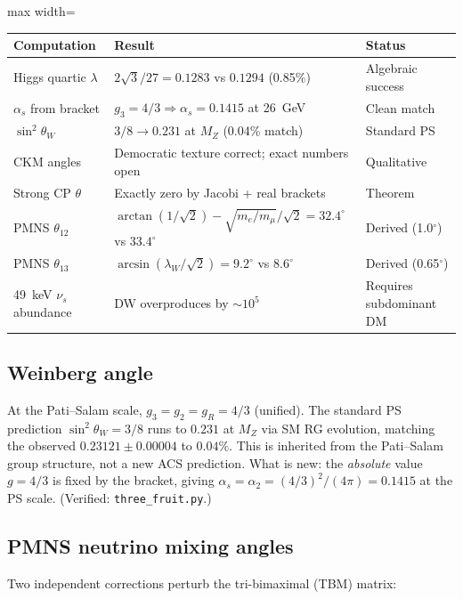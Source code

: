 \documentclass[11pt,a4paper]{article}
\theoremstyle{plain}
\theoremstyle{definition}
\theoremstyle{remark}
\begin{document}
\medskip
\begin{center}
\begin{adjustbox}{max width=\linewidth}\begin{tabular}{lll}
\toprule
Computation & Result & Status \\
\midrule
Higgs quartic $\lambda$ & $2\sqrt{3}/27 = 0.1283$ vs $0.1294$ (0.85\%) & Algebraic success \\
$\alpha_s$ from bracket & $g_3 = 4/3 \Rightarrow \alpha_s = 0.1415$ at 26~GeV & Clean match \\
$\sin^2\theta_W$ & $3/8 \to 0.231$ at $M_Z$ (0.04\% match) & Standard PS \\
CKM angles & Democratic texture correct; exact numbers open & Qualitative \\
Strong CP $\theta$ & Exactly zero by Jacobi + real brackets & Theorem \\
PMNS $\theta_{12}$ & $\arctan(1/\!\sqrt{2}) - \sqrt{m_e/m_\mu}/\!\sqrt{2} = 32.4^\circ$ vs $33.4^\circ$ & Derived (1.0$^\circ$) \\
PMNS $\theta_{13}$ & $\arcsin(\lambda_W/\!\sqrt{2}) = 9.2^\circ$ vs $8.6^\circ$ & Derived (0.65$^\circ$) \\
49~keV $\nu_s$ abundance & DW overproduces by $\sim 10^5$ & Requires subdominant DM \\
\bottomrule
\end{tabular}\end{adjustbox}
\end{center}

\subsection*{Weinberg angle}

At the Pati--Salam scale, $g_3 = g_2 = g_R = 4/3$ (unified).
The standard PS prediction $\sin^2\theta_W = 3/8$ runs to
$0.231$ at $M_Z$ via SM RG evolution, matching the observed
$0.23121 \pm 0.00004$ to $0.04\%$.  This is inherited from
the Pati--Salam group structure, not a new ACS prediction.
What is new: the \emph{absolute} value $g = 4/3$ is fixed by
the bracket, giving $\alpha_s = \alpha_2 = (4/3)^2/(4\pi) = 0.1415$
at the PS scale.
(Verified: \texttt{three\_fruit.py}.)

\subsection*{PMNS neutrino mixing angles}

Two independent corrections perturb the tri-bimaximal (TBM) matrix:
\end{document}
